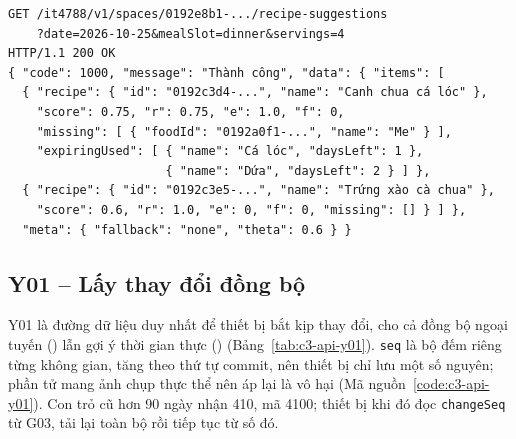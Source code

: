 \apiNeed{3.4cm}
\begin{Verbatim}[fontsize=\scriptsize]
GET /it4788/v1/spaces/0192e8b1-.../recipe-suggestions
    ?date=2026-10-25&mealSlot=dinner&servings=4
HTTP/1.1 200 OK
{ "code": 1000, "message": "Thành công", "data": { "items": [
  { "recipe": { "id": "0192c3d4-...", "name": "Canh chua cá lóc" },
    "score": 0.75, "r": 0.75, "e": 1.0, "f": 0,
    "missing": [ { "foodId": "0192a0f1-...", "name": "Me" } ],
    "expiringUsed": [ { "name": "Cá lóc", "daysLeft": 1 },
                      { "name": "Dứa", "daysLeft": 2 } ] },
  { "recipe": { "id": "0192c3e5-...", "name": "Trứng xào cà chua" },
    "score": 0.6, "r": 1.0, "e": 0, "f": 0, "missing": [] } ] },
  "meta": { "fallback": "none", "theta": 0.6 } }
\end{Verbatim}

\subsection{Y01 – Lấy thay đổi đồng bộ}\label{sssec:api-y01}

Y01 là đường dữ liệu duy nhất để thiết bị bắt kịp thay đổi, cho cả đồng bộ ngoại tuyến () lẫn gợi ý thời gian thực () (Bảng~\ref{tab:c3-api-y01}). \texttt{seq} là bộ đếm riêng từng không gian, tăng theo thứ tự commit, nên thiết bị chỉ lưu một số nguyên; phần tử mang ảnh chụp thực thể nên áp lại là vô hại (Mã nguồn~\ref{code:c3-api-y01}). Con trỏ cũ hơn 90 ngày nhận 410, mã 4100; thiết bị khi đó đọc \texttt{changeSeq} từ G03, tải lại toàn bộ rồi tiếp tục từ số đó.

